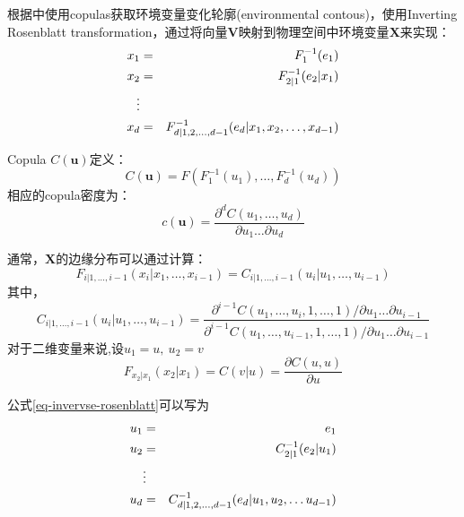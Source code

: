 根据\cite{Montes2015}中使用copulas获取环境变量变化轮廓(environmental contous)，使用\textcolor[rgb]{1,0,0}{Inverting Rosenblatt transformation}，通过将向量$\mathbf{V}$映射到物理空间中环境变量$\mathbf{X}$来实现：
\begin{eqnarray}
    \label{eq-invervse-rosenblatt}
    x_1 &=& F_1^{-1}(e_1)  \notag \\
    x_2 &=& F_{2|1}^{-1}(e_2|x_1) \notag \\
    \vdots \\
    x_d &=& F_{d|1,2,\dots,d-1}^{-1} (e_d | x_1,x_2,\dots,x_{d-1}) \notag
\end{eqnarray}

Copula $C(\mathbf{u})$定义：
\begin{equation}
    \label{eq-cf}
    C(\mathbf{u}) = F(F_1^{-1}(u_1),\dots,F_d^{-1}(u_d))
\end{equation}
相应的copula密度为：
\begin{equation}
    \label{eq-cfd}
    c(\mathbf{u}) = \dfrac{\partial^d C(u_1,\dots,u_d)}{\partial u_1\dots\partial u_d}
\end{equation}

通常，$\mathbf{X}$的边缘分布可以通过计算：
\begin{equation}
    \label{eq-margin}
    F_{i|1,\dots,i-1}(x_i|x_1,\dots,x_{i-1}) = C_{i|1,\dots,i-1}(u_i|u_1,\dots,u_{i-1})
\end{equation}
其中，
\begin{equation}
    \label{eq-margin2}
    C_{i|1,\dots,i-1}(u_i|u_1,\dots,u_{i-1}) = \dfrac{\partial^{i-1}C(u_1,\dots,u_i,1,\dots,1)/\partial u_1\dots\partial u_{i-1}}{\partial^{i-1}C(u_1,\dots,u_{i-1},1,\dots,1)/\partial u_1\dots\partial u_{i-1}} 
\end{equation}
对于二维变量来说,设$u_1 = u,\ u_2 = v$
\begin{equation}
    \label{eq-bivariate}
    F_{x_2|x_1}(x_2|x_1) = C(v|u) = \dfrac{\partial C(u,u)}{\partial u}
\end{equation}

公式\ref{eq-invervse-rosenblatt}可以写为
\begin{eqnarray}
    \label{eq-inverse-transform-using-copula}
    u_1 &=& e_1 \notag \\
    u_2 &=& C_{2|1}^{-1}(e_2|u_1) \notag\\
    &\vdots& \\
    u_d &=& C_{d|1,2,\dots,d-1}^{-1}(e_d|u_1,u_2,\dots u_{d-1}) \notag
\end{eqnarray}

